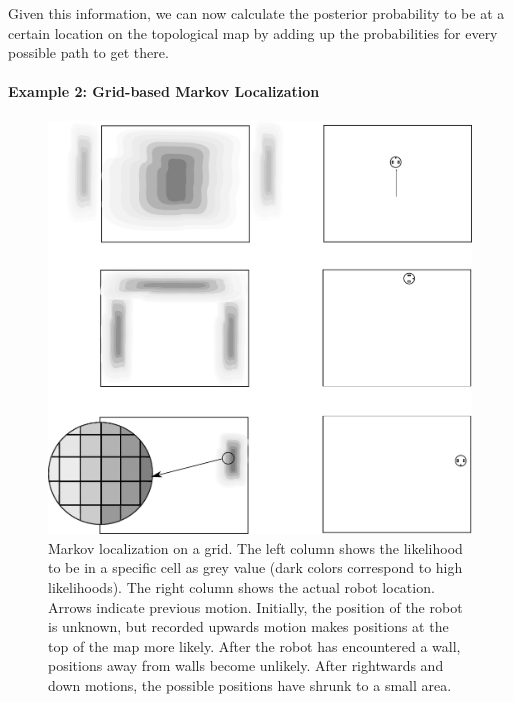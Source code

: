 Given this information, we can now calculate the posterior probability to be at a certain location on the topological map by adding up the probabilities for every possible path to get there.

\paragraph{Example 2: Grid-based Markov Localization}

\begin{figure}
	\centering
		\includegraphics[width=\textwidth]{figs/markov_grid_example}
	\caption{Markov localization on a grid. The left column shows the likelihood to be in a specific cell as grey value (dark colors correspond to high likelihoods). The right column shows the actual robot location. Arrows indicate previous motion. Initially, the position of the robot is unknown, but recorded upwards motion makes positions at the top of the map more likely. After the robot has encountered a wall, positions away from walls become unlikely. After rightwards and down motions, the possible positions have shrunk to a small area.}
	\label{fig:markov_grid_example}
\end{figure}

